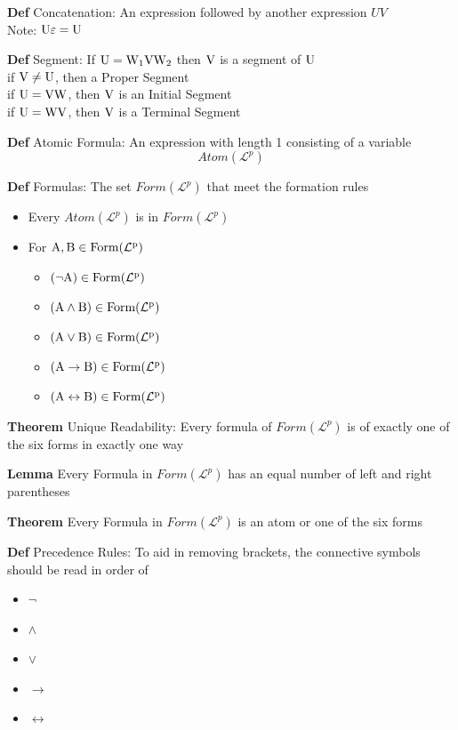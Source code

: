 \documentclass[11pt,notitlepage]{report}
\newcommand{\mc}[1]{\ensuremath{\mathcal{#1}}}
\newcommand{\tbf}[1]{\textbf{#1}}
\begin{document}
\tbf{Def} Concatenation: An expression followed by another expression $UV$\\
\hspace*{5mm} Note: $\rm U\varepsilon = \rm U$

\tbf{Def} Segment: If $\rm U = \rm W_1 \rm V \rm W_2$ then $\rm V$ is a segment of $\rm U$\\
\hspace*{5mm} if $\rm V \ne \rm U$, then a Proper Segment\\
\hspace*{5mm} if $\rm U = \rm V \rm W$, then $\rm V$ is an Initial Segment\\
\hspace*{5mm} if $\rm U = \rm W\rm V$, then $\rm V$ is a Terminal Segment

\tbf{Def} Atomic Formula: An expression with length 1 consisting of a variable
$$Atom(\mc L^p)$$

\tbf{Def} Formulas: The set $Form(\mathcal L^p)$ that meet the formation rules
\begin{itemize}
    \item Every $Atom(\mc L^p)$ is in $Form(\mc L^p)$
    \item For $\rm A, \rm B \in Form(\mc L^p)$
    \begin{itemize}
        \item $(\neg \rm A) \in Form(\mc L^p)$
        \item $(\rm A \wedge \rm B) \in Form(\mc L^p)$
        \item $(\rm A \vee \rm B) \in Form(\mc L^p)$
        \item $(\rm A \to \rm B) \in Form(\mc L^p)$
        \item $(\rm A \leftrightarrow \rm B) \in Form(\mc L^p)$
    \end{itemize}
\end{itemize}

\tbf{Theorem} Unique Readability: Every formula of $Form(\mc L^p)$ is of exactly one of the six forms in exactly one way

\tbf{Lemma} Every Formula in $Form(\mc L^p)$ has an equal number of left and right parentheses

\tbf{Theorem} Every Formula in $Form(\mc L^p)$ is an atom or one of the six forms

\newpage
\tbf{Def} Precedence Rules: To aid in removing brackets, the connective symbols should be read in order of
\begin{itemize}
    \item $\neg$
    \item $\wedge$
    \item $\vee$
    \item $\to$
    \item $\leftrightarrow$
\end{itemize}
\end{document}
